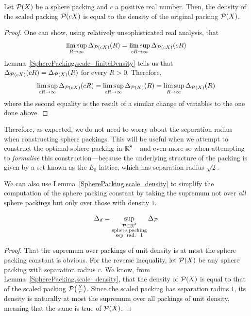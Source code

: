 \begin{lemma}\label{SpherePacking.scale_density}\leanok
  Let $\mathcal{P}(X)$ be a sphere packing and $c$ a positive real number. Then, the density of the scaled packing $\mathcal{P}(cX)$ is equal to the density of the original packing $\mathcal{P}(X)$.
\end{lemma}
\begin{proof}\leanok
  One can show, using relatively unsophisticated real analysis, that
  \[
    \limsup_{R \to \infty} \Delta_{\mathcal{P}(cX)}(R) = \limsup_{cR \to \infty} \Delta_{\mathcal{P}(cX)}(cR)
  \]
  Lemma~\ref{SpherePacking.scale_finiteDensity} tells us that $\Delta_{\mathcal{P}(cX)}(cR) = \Delta_{\mathcal{P}(X)}(R)$ for every $R > 0$. Therefore,
  \[
    \limsup_{cR \to \infty} \Delta_{\mathcal{P}(cX)}(cR) = \limsup_{cR \to \infty} \Delta_{\mathcal{P}(X)}(R) = \limsup_{R \to \infty} \Delta_{\mathcal{P}(X)}(R)
  \]
  where the second equality is the result of a similar change of variables to the one done above.
\end{proof}

Therefore, as expected, we do not need to worry about the separation radius when constructing sphere packings. This will be useful when we attempt to construct the optimal sphere packing in $\mathbb{R}^8$---and even more so when attempting to \emph{formalise} this construction---because the underlying structure of the packing is given by a set known as the $E_8$ lattice, which has separation radius $\sqrt{2}$.

We can also use Lemma~\ref{SpherePacking.scale_density} to simplify the computation of the sphere packing constant by taking the supremum not over \emph{all} sphere packings but only over those with density $1$.

\begin{lemma}\label{SpherePacking.constant_eq_constant_normalized}\leanok
  \[
    \Delta_d = \sup\limits_{\substack{\mathcal{P} \subset \mathbb{R}^d \\ \text{sphere packing} \\ \text{sep.~rad.} = 1}} \Delta_{\mathcal{P}}
  \]
\end{lemma}
\begin{proof}\leanok
  That the supremum over packings of unit density is at most the sphere packing constant is obvious. For the reverse inequality, let $\mathcal{P}(X)$ be any sphere packing with separation radius $r$. We know, from Lemma~\ref{SpherePacking.scale_density}, that the density of $\mathcal{P}(X)$ is equal to that of the scaled packing $\mathcal{P}\!\left(\frac{X}{r}\right)$. Since the scaled packing has separation radius $1$, its density is naturally at most the supremum over all packings of unit density, meaning that the same is true of $\mathcal{P}(X)$.
\end{proof}
